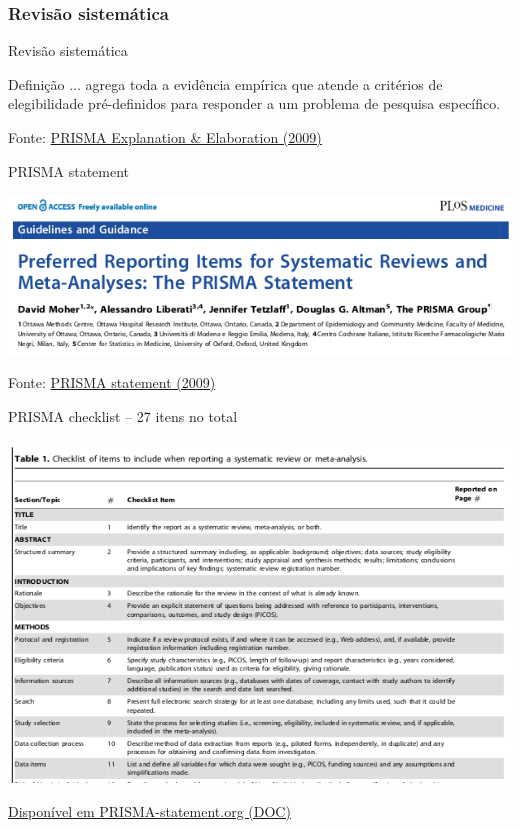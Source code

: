 \documentclass{beamer}
\begin{document}
\subsubsection[Sistemática]{Revisão sistemática}

\begin{frame}{Revisão sistemática}
  \begin{block}{Definição}
    \footnotesize
    ... agrega toda a evidência empírica que atende a critérios de elegibilidade pré-definidos para responder a um problema de pesquisa específico.
  \end{block}

  \vfill
  \scriptsize
  \hfill Fonte: \href{https://doi.org/10.1371/journal.pmed.1000100}
  {\tiny PRISMA Explanation \& Elaboration (2009)}
\end{frame}

\begin{frame}{PRISMA statement}
  \begin{center}
    \includegraphics[width=\textwidth]{Revisao_resumo/PRISMA-statement}
  \end{center}

  \vfill
  \scriptsize
  \hfill Fonte: \href{https://doi.org/10.1371/journal.pmed.1000097}
  {\tiny PRISMA statement (2009)}
\end{frame}

\begin{frame}{PRISMA checklist -- 27 itens no total}
  \begin{center}
    \includegraphics[height=.8\textheight]{Revisao_resumo/PRISMA-checklist}
  \end{center}

  \vfill
  \scriptsize
  \hfill \href{http://www.prisma-statement.org/}
  {\tiny Disponível em PRISMA-statement.org (DOC)}
\end{frame}
\end{document}
